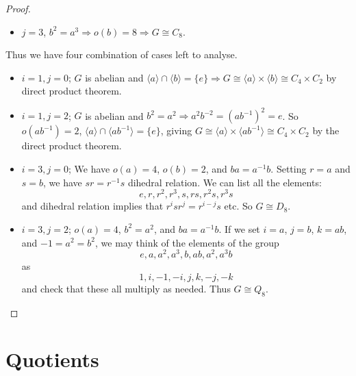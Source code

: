 \documentclass[10pt, a4paper, twoside]{report}
\begin{document}
\begin{proof}
\begin{itemize}
        \item \(j=3\), \(b^2=a^3\Rightarrow o(b)=8\Rightarrow G\cong C_8\).
    \end{itemize}
    Thus we have four combination of cases left to analyse.
    \begin{itemize}
        \item \(i=1,j=0\); \(G\) is abelian and \(\langle a\rangle\cap\langle b\rangle=\{e\}\Rightarrow G\cong\langle a\rangle\times\langle b\rangle\cong C_4\times C_2\) by direct product theorem.
        \item \(i=1,j=2\); \(G\) is abelian and \(b^2=a^2\Rightarrow a^2b^{-2}=(ab^{-1})^2=e\). So \(o(ab^{-1})=2\), \(\langle a\rangle\cap\langle ab^{-1}\rangle=\{e\}\), giving \(G\cong\langle a\rangle\times\langle ab^{-1}\rangle\cong C_4\times C_2\) by the direct product theorem.
        \item \(i=3,j=0\); We have \(o(a)=4\), \(o(b)=2\), and \(ba=a^{-1}b\). Setting \(r=a\) and \(s=b\), we have \(sr=r^{-1}s\) dihedral relation. We can list all the elements:
        \[e,r,r^2,r^3,s,rs,r^2s,r^3s\]
        and dihedral relation implies that \(r^isr^j=r^{i-j}s\) etc. So \(G\cong D_8\).
        \item \(i=3,j=2\); \(o(a)=4\), \(b^2=a^2\), and \(ba=a^{-1}b\). If we set \(i=a\), \(j=b\), \(k=ab\), and \(-1=a^2=b^2\), we may think of the elements of the group
        \[e,a,a^2,a^3,b,ab,a^2,a^3b\]
        as 
        \[1,i,-1,-i,j,k,-j,-k\]
        and check that these all multiply as needed. Thus \(G\cong Q_8\).
    \end{itemize}
\end{proof}
\section{Quotients}
\end{document}
